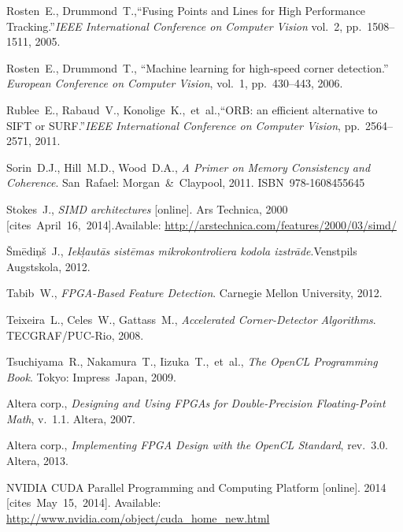 {\begin{thebibliography}{99}
			Rosten~E., Drummond~T.,\linebreak[1]
			``Fusing Points and Lines for High Performance Tracking.''\linebreak[1]
			\textit{IEEE International Conference on Computer Vision} vol.~2,
			pp.~1508--1511, 2005.
		
			Rosten~E., Drummond~T.,
			``Machine learning for high-speed corner detection.''
			\textit{European Conference on Computer Vision}, vol.~1, pp.~430--443,
			2006.
		
			Rublee~E., Rabaud~V., Konolige~K.,~et~al.,\linebreak[1]
			``ORB: an efficient alternative to SIFT or SURF.''\linebreak[1]
			\textit{IEEE International Conference on Computer Vision},
			pp.~2564--2571, 2011.
		
			Sorin~D.J., Hill~M.D., Wood~D.A.,
			\textit{A Primer on Memory Consistency and Coherence}.
			San~Rafael: Morgan~\&~Claypool, 2011. ISBN~978-1608455645
		
			Stokes~J.,
			\textit{SIMD architectures} [online]. Ars Technica, 2000 %
			[cites~April~16,~2014].\linebreak[1]
			Available: \url{http://arstechnica.com/features/2000/03/simd/}
		
			Šmēdiņš~J.,
			\textit{Iekļautās sistēmas mikrokontroliera kodola izstrāde}.\linebreak[1]
			Venstpils Augstskola, 2012.
		
			Tabib~W.,
			\textit{FPGA-Based Feature Detection}.
			Carnegie Mellon University, 2012.
		
			Teixeira~L., Celes~W., Gattass~M.,
			\textit{Accelerated Corner-Detector Algorithms}.
			TECGRAF/PUC-Rio, 2008.
		
			Tsuchiyama~R., Nakamura~T., Iizuka~T.,~et~al.,
			\textit{The OpenCL Programming Book}. Tokyo: Impress~Japan, 2009.
		
			Altera corp., \textit{Designing and Using FPGAs for
				Double-Precision Floating-Point Math}, v.~1.1. Altera, 2007.
		
			Altera corp., \textit{Implementing FPGA Design with
				the OpenCL Standard}, rev.~3.0. Altera, 2013.
		
			NVIDIA CUDA Parallel Programming and Computing Platform [online].
			2014 [cites~May~15,~2014].
			Available: \url{http://www.nvidia.com/object/cuda_home_new.html}
	\end{thebibliography}
} %
